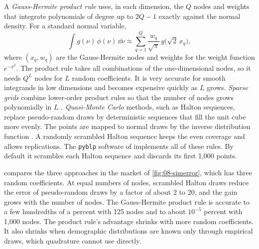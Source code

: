A \emph{Gauss-Hermite product rule} uses, in each dimension, the $Q$ nodes and weights that integrate polynomials of
degree up to $2Q - 1$ exactly against the normal density. For a standard normal variable,
\begin{equation}\label{eq:08-gauss-hermite}
  \int g(\nu)\, \phi(\nu)\, \dd\nu \approx \sum_{q=1}^{Q} \frac{w_q}{\sqrt{\pi}}\, g\bigl(\sqrt{2}\, x_q\bigr),
\end{equation}
where $(x_q, w_q)$ are the Gauss-Hermite nodes and weights for the weight function $e^{-x^2}$. The product rule takes
all combinations of the one-dimensional nodes, so it needs $Q^{L}$ nodes for $L$ random coefficients. It is very
accurate for smooth integrands in low dimensions and becomes expensive quickly as $L$ grows. \emph{Sparse grids}
combine lower-order product rules so that the number of nodes grows polynomially in $L$ \citep{HeissWinschel2008}.
\emph{Quasi-Monte Carlo} methods, such as Halton sequences, replace pseudo-random draws by deterministic sequences that
fill the unit cube more evenly. The points are mapped to normal draws by the inverse distribution function
\citep[Section~9.3.3]{Train2009}.
A randomly scrambled Halton sequence keeps the even coverage and allows replications. The
\texttt{pyblp} software of \citet[Section~3]{ConlonGortmaker2020} implements all of these rules. By default it
scrambles each Halton sequence and discards its first 1,000 points.

 compares the three approaches in the market of \cref{fig:08-simerror}, which has three random
coefficients. At equal numbers of nodes, scrambled Halton draws reduce the error of pseudo-random draws by a factor of
about 2 to 20, and the gain grows with the number of nodes. The Gauss-Hermite product rule is accurate to a few hundredths of a percent with 125 nodes and to about
$10^{-5}$ percent with 1,000 nodes. The product rule's advantage shrinks with more random coefficients. It also shrinks when
demographic distributions are known only through empirical draws, which quadrature cannot use directly.

